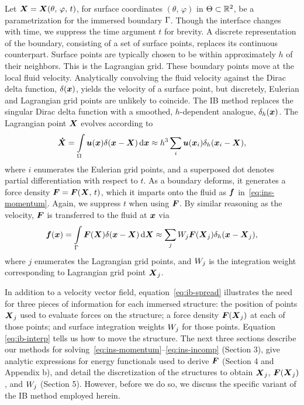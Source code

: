 Let $\boldsymbol{X} = \boldsymbol{X}(\theta,\,\varphi,\,t)$, for surface coordinates $(\theta,\,\varphi)$ in
$\Theta\subset\mathbb{R}^2$, be a parametrization for the immersed boundary $\Gamma$.
Though the interface changes with time, we suppress the time argument $t$ for brevity. A
discrete representation of the boundary, consisting of a set of surface points, replaces
its continuous counterpart.  Surface points are typically chosen to be within
approximately $h$ of their neighbors.  This is the Lagrangian grid. These boundary points
move at the local fluid velocity.  Analytically convolving the fluid velocity against the
Dirac delta function, $\delta(\boldsymbol{x})$, yields the velocity of a surface point, but
discretely, Eulerian and Lagrangian grid points are unlikely to coincide. The IB method
replaces the singular Dirac delta function with a smoothed, $h$-dependent analogue,
$\delta_h(\boldsymbol{x})$. The Lagrangian point $\boldsymbol{X}$ evolves according to
\begin{equation}\label{eq:ib-interp}
    \vec{\dot{X}}
        = \int\limits_{\domain} \u(\x) \Dirac(\x-\X) \d\x
        \approx h^3 \sum_{i} \u(\x_i) \Dirac_h(\x_i-\X),
\end{equation}
where $i$ enumerates the Eulerian grid points, and a superposed dot denotes partial
differentiation with respect to $t$. As a boundary deforms, it generates a force density
$\boldsymbol{F} = \boldsymbol{F}(\boldsymbol{X},\,t)$, which it imparts onto the fluid as $\boldsymbol{f}$ in~\eqref{eq:ins-momentum}.
Again, we suppress $t$ when using $\boldsymbol{F}$. By similar reasoning as the velocity, $\boldsymbol{F}$ is
transferred to the fluid at $\boldsymbol{x}$ via
\begin{equation}\label{eq:ib-spread}
        \f(\x)
        = \int\limits_{\interface} \F(\X)\Dirac(\x-\X) \d\X
        \approx \sum_{j} \weight[j]\F(\X_j) \Dirac_h(\x-\X_j),
\end{equation}
where $j$ enumerates the Lagrangian grid points, and $\weight[j]$ is the integration
weight corresponding to Lagrangian grid point $\boldsymbol{X}_j$. 

In addition to a velocity vector field, equation~\eqref{eq:ib-spread} illustrates the
need for three pieces of information for each immersed structure: the position of points
$\boldsymbol{X}_j$ used to evaluate forces on the structure; a force density $\boldsymbol{F}(\boldsymbol{X}_j)$ at each of
those points; and surface integration weights $\weight[j]$ for those points. Equation~%
\eqref{eq:ib-interp} tells us how to move the structure. The next three sections describe
our methods for solving~\eqref{eq:ins-momentum}--\eqref{eq:ins-incomp} (Section 3), give analytic
expressions for energy functionals used to derive $\boldsymbol{F}$ (Section 4 and Appendix b), and detail the discretization of the structures to obtain $\boldsymbol{X}_j$,
$\boldsymbol{F}(\boldsymbol{X}_j)$, and $\weight[j]$ (Section 5). However, before we do so, we discuss the specific variant
of the IB method employed herein.

